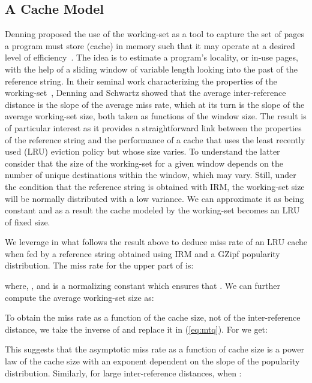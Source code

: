 \documentclass[twocolumn, 10pt]{article}
\theoremstyle{plain}
\begin{document}
\subsection{A Cache Model} 

Denning proposed the use of the working-set as a tool to capture the set of
pages a program must store (cache) in memory such that it may operate at a
desired level of efficiency~\cite{denning:ws_model}. The idea is to estimate a
program's locality, or in-use pages, with the help of a sliding window of
variable length looking into the past of the reference string.  In their
seminal work characterizing the properties of the
working-set~\cite{denning:ws_properties}, Denning and Schwartz showed that the
average inter-reference distance is the slope of the average miss rate,
which at its turn is the slope of the average working-set size, both taken as
functions of the window size. The result is of particular interest as it
provides a straightforward link between the properties of the reference string
and the performance of a cache that uses the least recently used (LRU)
eviction policy but whose size varies. To understand the latter consider that
the size of the working-set for a given window depends on the number of
unique destinations within the window, which may vary. Still, under
the condition 
that the reference string is obtained with IRM, the working-set size will be
normally distributed with a low variance. We can approximate it as being
constant and as a result the cache modeled by the working-set becomes an LRU
of fixed size. 

We leverage in what follows the result above to deduce miss rate of an LRU
cache when fed by a reference string obtained using IRM and a GZipf popularity
distribution. The miss rate for the upper part of  is:



\noindent where, ,  and  is a normalizing constant
which ensures that . We can further
compute the average working-set size as:



To obtain the miss rate as a function of the cache size, not of the
inter-reference distance, we take the inverse of  and replace it in
(\ref{eq:mtq}). For  we get:



This suggests that the asymptotic miss rate as a function of cache size is a
power law of the cache size with an exponent dependent on the slope of the
popularity distribution. Similarly, for large inter-reference distances, when
:
\end{document}
